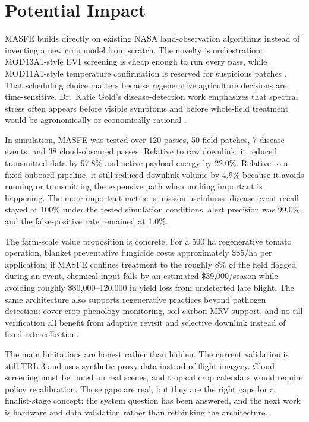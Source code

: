\section{Potential Impact}

MASFE builds directly on existing NASA land-observation algorithms instead of inventing a new crop model from scratch. The novelty is orchestration: MOD13A1-style EVI screening is cheap enough to run every pass, while MOD11A1-style temperature confirmation is reserved for suspicious patches \cite{mod13a1,mod11a1}. That scheduling choice matters because regenerative agriculture decisions are time-sensitive. Dr.\ Katie Gold's disease-detection work emphasizes that spectral stress often appears before visible symptoms and before whole-field treatment would be agronomically or economically rational \cite{gold-webinar1}.

In simulation, MASFE was tested over 120 passes, 50 field patches, 7 disease events, and 38 cloud-obscured passes. Relative to raw downlink, it reduced transmitted data by 97.8\% and active payload energy by 22.0\%. Relative to a fixed onboard pipeline, it still reduced downlink volume by 4.9\% because it avoids running or transmitting the expensive path when nothing important is happening. The more important metric is mission usefulness: disease-event recall stayed at 100\% under the tested simulation conditions, alert precision was 99.0\%, and the false-positive rate remained at 1.0\%.

The farm-scale value proposition is concrete. For a 500 ha regenerative tomato operation, blanket preventative fungicide costs approximately \$85/ha per application; if MASFE confines treatment to the roughly 8\% of the field flagged during an event, chemical input falls by an estimated \$39{,}000/season while avoiding roughly \$80{,}000--120{,}000 in yield loss from undetected late blight. The same architecture also supports regenerative practices beyond pathogen detection: cover-crop phenology monitoring, soil-carbon MRV support, and no-till verification all benefit from adaptive revisit and selective downlink instead of fixed-rate collection.

The main limitations are honest rather than hidden. The current validation is still TRL 3 and uses synthetic proxy data instead of flight imagery. Cloud screening must be tuned on real scenes, and tropical crop calendars would require policy recalibration. Those gaps are real, but they are the right gaps for a finalist-stage concept: the system question has been answered, and the next work is hardware and data validation rather than rethinking the architecture.
